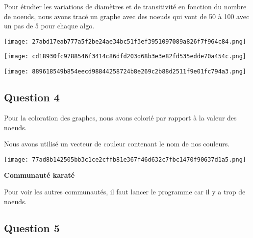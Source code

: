 \documentclass[12pt]{report}
\begin{document}
\textbf{}

\textbf{}

Pour étudier les variations de diamètres et de transitivité en fonction
du nombre de noeuds, nous avons tracé un graphe avec des noeuds qui vont
de 50 à 100 avec un pas de 5 pour chaque algo.

\begin{center} 

 \texttt{[image: 27abd17eab777a5f2be24ae34bc51f3ef3951097089a826f7f964c84.png]}


\end{center}

\begin{center} 

 \texttt{[image: cd18930fc9788546f3414c86dfd203d68b3e3e82fd535edde70a454c.png]}


\end{center}

\begin{center} 

 \texttt{[image: 889618549b854eecd98844258724b8e269c2b88d2511f9e01fc794a3.png]}


\end{center}

\subsection{Question 4}

Pour la coloration des graphes, nous avons colorié par rapport à la
valeur des noeuds.

Nous avons utilisé un vecteur de couleur contenant le nom de nos
couleurs.

\begin{center} 

 \texttt{[image: 77ad8b142505bb3c1ce2cffb81e367f46d632c7fbc1470f90637d1a5.png]}


\end{center}

\textbf{Communauté karaté}

\textbf{}

Pour voir les autres communautés, il faut lancer le programme car il y a
trop de noeuds. 

\subsection{Question 5}
\end{document}
